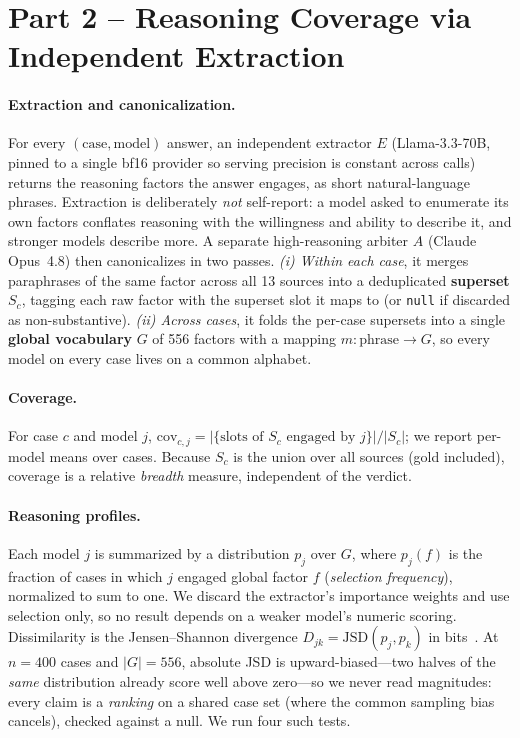\documentclass{article}
\begin{document}
\section{Part 2 -- Reasoning Coverage via Independent Extraction}

\paragraph{Extraction and canonicalization.} For every $(\text{case},\text{model})$ answer, an
independent extractor $E$ (Llama-3.3-70B, pinned to a single bf16 provider so serving precision
is constant across calls) returns the reasoning factors the answer engages, as short
natural-language phrases. Extraction is deliberately \emph{not} self-report: a model asked to
enumerate its own factors conflates reasoning with the willingness and ability to describe it,
and stronger models describe more. A separate high-reasoning arbiter $A$ (Claude Opus~4.8) then
canonicalizes in two passes. \emph{(i) Within each case}, it merges paraphrases of the same
factor across all 13 sources into a deduplicated \textbf{superset} $S_c$, tagging each raw
factor with the superset slot it maps to (or \texttt{null} if discarded as non-substantive).
\emph{(ii) Across cases}, it folds the per-case supersets into a single \textbf{global
vocabulary} $G$ of 556 factors with a mapping $m:\text{phrase}\!\to\!G$, so every model on every
case lives on a common alphabet.

\paragraph{Coverage.} For case $c$ and model $j$,
$\mathrm{cov}_{c,j}=|\{\text{slots of }S_c\text{ engaged by }j\}| / |S_c|$; we report per-model
means over cases. Because $S_c$ is the union over all sources (gold included), coverage is a
relative \emph{breadth} measure, independent of the verdict.

\paragraph{Reasoning profiles.} Each model $j$ is summarized by a distribution $p_j$ over $G$,
where $p_j(f)$ is the fraction of cases in which $j$ engaged global factor $f$ (\emph{selection
frequency}), normalized to sum to one. We discard the extractor's importance weights and use
selection only, so no result depends on a weaker model's numeric scoring. Dissimilarity is the
Jensen--Shannon divergence $D_{jk}=\mathrm{JSD}(p_j,p_k)$ in bits~\citep{lin1991divergence}. At
$n{=}400$ cases and $|G|{=}556$, absolute JSD is upward-biased---two halves of the \emph{same}
distribution already score well above zero---so we never read magnitudes: every claim is a
\emph{ranking} on a shared case set (where the common sampling bias cancels), checked against a
null. We run four such tests.
\end{document}
